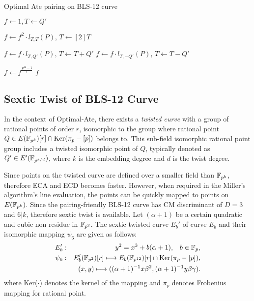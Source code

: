 \begin{algorithm}[H]
	\caption{Optimal Ate pairing on BLS-12 curve}
	\label{optimal_algo}
	\DontPrintSemicolon

	\hspace{-3ex}
\hspace{-3ex}
	
	\nl $f \leftarrow 1,T \leftarrow Q'$\;
	\nl {} {
	\nl $f\leftarrow f^2\cdot l_{T,T}(P)$, $T\leftarrow [2]T$\;

	\nl {} {
	\nl $f\leftarrow f\cdot l_{T,Q'}(P)$, $T\leftarrow T+Q'$}
    \nl {} {
	\nl $f\leftarrow f\cdot l_{T,-Q'}(P)$, $T\leftarrow T-Q'$}}
	\nl $f\leftarrow f^{\frac{p^{12}-1}{r}}$\;
	 $f$\;
\end{algorithm}
\vspace{-0.6em}

\subsection{Sextic Twist of BLS-12 Curve} \label{sextic_twist}
In the context of Optimal-Ate, there exists a \textit{twisted curve} with a group of rational points of order $r$, isomorphic to the group where rational point $Q \in  E({\mathbb{F}}_{p^{k}}) [r] \cap \text{Ker}(\pi_p - [p])$  belongs to. This sub-field isomorphic rational point group includes a twisted isomorphic point of $Q$, typically denoted as $Q' \in E'(\mathbb{F}_{p^{k/d}})$, where $k$ is the embedding degree and $d$ is the twist degree.  

Since points on the twisted curve are defined over a smaller field than $\mathbb{F}_{p^k}$, therefore ECA and ECD becomes faster. 
However, when required in the Miller's algorithm's line evaluation, the points can be quickly mapped to points on $E(\mathbb{F}_{p^k} )$. 
Since the pairing-friendly BLS-12 \cite{SCN:BarLynSco02} curve has CM discriminant of $D = 3$ and $6|k$, therefore sextic twist is available.
Let $(\alpha+1)$ be a certain quadratic and cubic non residue in $\mathbb{F}_{p^2}$.  The sextic twisted curve $E_b'$ of  curve $E_b$ and their isomorphic mapping $\psi_6$ are given as follows:
\begin{eqnarray}
	E_b'&:&y^2=x^3+b(\alpha+1),\;\;\;b\in{\mathbb{F}}_{p}, \nonumber\\
	\psi_6&:&E_b'(\mathbb{F}_{p^2})[r] \longmapsto E_b(\mathbb{F}_{p^{12}})[r]\cap {\rm Ker}(\pi_p-[p]),\nonumber\\
	&&(x,y)\longmapsto ((\alpha+1)^{-1}x \beta^2,(\alpha+1)^{-1}y\beta\gamma).\label{map_bn}
\end{eqnarray}
where Ker($\cdot$) denotes the kernel of the mapping and $\pi_p$ denotes Frobenius mapping  for rational point.

